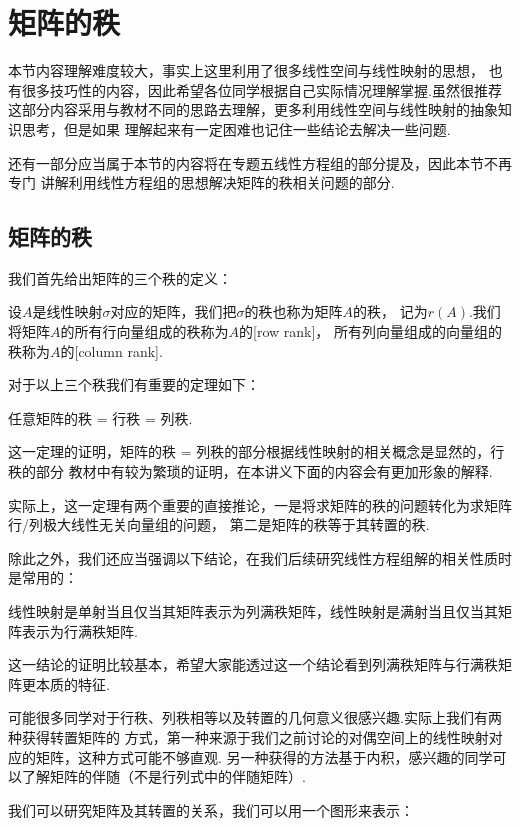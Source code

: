 \chapter{矩阵的秩}
本节内容理解难度较大，事实上这里利用了很多线性空间与线性映射的思想，
也有很多技巧性的内容，因此希望各位同学根据自己实际情况理解掌握.虽然很推荐
这部分内容采用与教材不同的思路去理解，更多利用线性空间与线性映射的抽象知识思考，但是如果
理解起来有一定困难也记住一些结论去解决一些问题.

还有一部分应当属于本节的内容将在专题五线性方程组的部分提及，因此本节不再专门
讲解利用线性方程组的思想解决矩阵的秩相关问题的部分.

\section{矩阵的秩}
我们首先给出矩阵的三个秩的定义：
\begin{definition}
    设$A$是线性映射$\sigma$对应的矩阵，我们把$\sigma$的秩也称为矩阵$A$的秩，
    记为$r(A)$.我们将矩阵$A$的所有行向量组成的秩称为$A$的[row rank]，
    所有列向量组成的向量组的秩称为$A$的[column rank].
\end{definition}
对于以上三个秩我们有重要的定理如下：
\begin{theorem}
    任意矩阵的秩 = 行秩 = 列秩.
\end{theorem}
这一定理的证明，矩阵的秩 = 列秩的部分根据线性映射的相关概念是显然的，行秩的部分
教材中有较为繁琐的证明，在本讲义下面的内容会有更加形象的解释.

实际上，这一定理有两个重要的直接推论，一是将求矩阵的秩的问题转化为求矩阵行/列极大线性无关向量组的问题，
第二是矩阵的秩等于其转置的秩.

除此之外，我们还应当强调以下结论，在我们后续研究线性方程组解的相关性质时是常用的：
\begin{theorem}
    线性映射是单射当且仅当其矩阵表示为列满秩矩阵，线性映射是满射当且仅当其矩阵表示为行满秩矩阵.
\end{theorem}
这一结论的证明比较基本，希望大家能透过这一个结论看到列满秩矩阵与行满秩矩阵更本质的特征.

可能很多同学对于行秩、列秩相等以及转置的几何意义很感兴趣.实际上我们有两种获得转置矩阵的
方式，第一种来源于我们之前讨论的对偶空间上的线性映射对应的矩阵，这种方式可能不够直观.
另一种获得的方法基于内积，感兴趣的同学可以了解矩阵的伴随（不是行列式中的伴随矩阵）.

我们可以研究矩阵及其转置的关系，我们可以用一个图形来表示：

